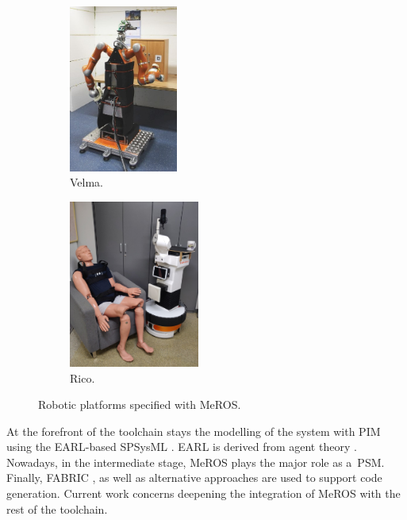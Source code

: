 \documentclass{ieeeaccess}
\begin{document}
	   
	
	\begin{figure}[htb]
		\centering
		\begin{subfigure}[b]{.43\columnwidth}
			\includegraphics[height=5.5cm]{img/velma.jpg}
			\caption{Velma.}
			\label{fig:velma}
		\end{subfigure}
		\begin{subfigure}[b]{.47\columnwidth}
			\includegraphics[height=5.5cm]{img/rico.jpg}
			\caption{Rico.}\label{fig:rico}
		\end{subfigure}
		\caption{Robotic platforms specified with MeROS.}
		\label{fig:robots}
	\end{figure}
		
	At the forefront of the toolchain stays the modelling of the system with PIM using the EARL-based \cite{earl2020} SPSysML \cite{dudek2023spsysml}. EARL is derived from agent theory \cite{kornuta-bpan-2020, zielinski2010motion,zielinski2017variable}. Nowadays, in the intermediate stage, MeROS plays the major role as a~PSM. Finally, FABRIC  \cite{Seredynski-fabric-romoco-2019}, as well as alternative approaches \cite{winiarskimmar2015,figat2020robotic} are used to support code generation. Current work concerns deepening the integration of MeROS with the rest of the toolchain.
	
			
	
	
\end{document}
